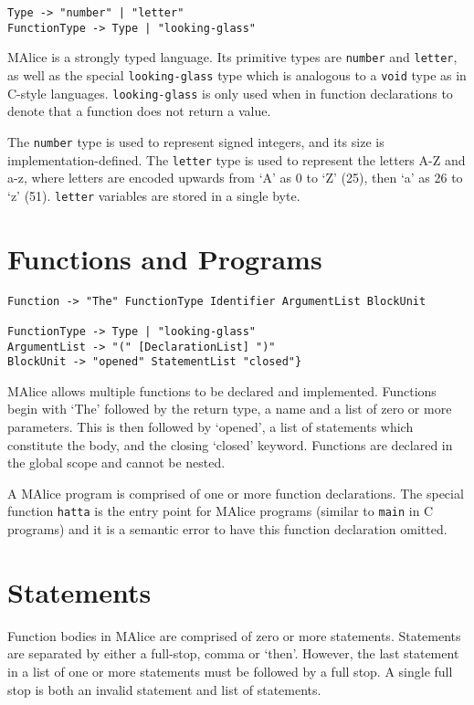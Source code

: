 \documentclass[a4wide, 11pt]{article}
\begin{document}
\begin{verbatim}
Type -> "number" | "letter"
FunctionType -> Type | "looking-glass"
\end{verbatim}

MAlice is a strongly typed language. Its primitive types are \texttt{number} and \texttt{letter}, as well as the special \texttt{looking-glass} type which is analogous to a \texttt{void} type as in C-style languages. \texttt{looking-glass} is only used when in function declarations to denote that a function does not return a value.

The \texttt{number} type is used to represent signed integers, and its size is implementation-defined. The \texttt{letter} type is used to represent the letters A-Z and a-z, where letters are encoded upwards from `A' as 0 to `Z' (25), then `a' as 26 to `z' (51). \texttt{letter} variables are stored in a single byte.

\section{Functions and Programs}

\begin{verbatim}
Function -> "The" FunctionType Identifier ArgumentList BlockUnit

FunctionType -> Type | "looking-glass"
ArgumentList -> "(" [DeclarationList] ")"
BlockUnit -> "opened" StatementList "closed"}
\end{verbatim}

MAlice allows multiple functions to be declared and implemented. Functions begin with `The' followed by the return type, a name and a list of zero or more parameters. This is then followed by `opened', a list of statements which constitute the body, and the closing `closed' keyword. Functions are declared in the global scope and cannot be nested.

A MAlice program is comprised of one or more function declarations. The special function \texttt{hatta} is the entry point for MAlice programs (similar to \texttt{main} in C programs) and it is a semantic error to have this function declaration omitted.

\section{Statements}

Function bodies in MAlice are comprised of zero or more statements. Statements are separated by either a full-stop, comma or `then'. However, the last statement in a list of one or more statements must be followed by a full stop. A single full stop is both an invalid statement and list of statements.
  
\end{document}
